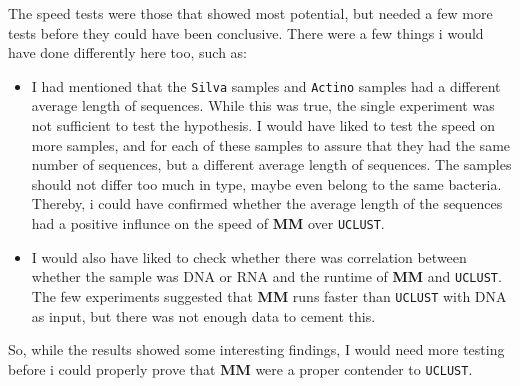 \documentclass[../../main.tex]{subfiles}
\begin{document}
The speed tests were those that showed most potential, but needed a few more tests before they could have been conclusive. There were a few things i would have done differently here too, such as:
\begin{itemize}
\item I had mentioned that the {\tt Silva} samples and {\tt Actino} samples had a different average length of sequences. While this was true, the single experiment was not sufficient to test the hypothesis. I would have liked to test the speed on more samples, and for each of these samples to assure that they had the same number of sequences, but a different average length of sequences. The samples should not differ too much in type, maybe even belong to the same bacteria. Thereby, i could have confirmed whether the average length of the sequences had a positive influnce on the speed of {\bf MM} over {\tt UCLUST}.
\item I would also have liked to check whether there was correlation between whether the sample was DNA or RNA and the runtime of {\bf MM} and {\tt UCLUST}. The few experiments suggested that {\bf MM} runs faster than {\tt UCLUST} with DNA as input, but there was not enough data to cement this. 
\end{itemize}
So, while the results showed some interesting findings, I would need more testing before i could properly prove that {\bf MM} were a proper contender to {\tt UCLUST}.
\end{document}
